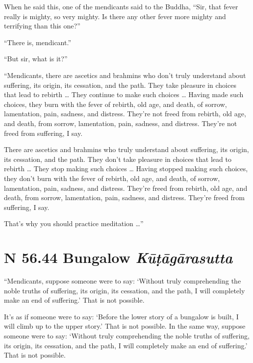 \documentclass[12pt,openany]{book}%
\newcommand*{\suttatitleacronym}[1]{\smaller[2]{#1}\vspace*{.3em}}
\newcommand*{\suttatitletranslation}[1]{\linebreak{#1}}
\newcommand*{\suttatitleroot}[1]{\linebreak\smaller[2]\itshape{#1}}
\newcommand*{\tocacronym}[1]{\hspace*{-3.3em}{#1}\quad}
\newcommand*{\toctranslation}[1]{#1}
\newcommand*{\tocroot}[1]{(\textit{#1})}
\begin{document}
When he said this, one of the mendicants said to the Buddha, “Sir, that fever really is mighty, so very mighty. Is there any other fever more mighty and terrifying than this one?” 

“There is, mendicant.” 

“But sir, what is it?” 

“Mendicants, there are ascetics and brahmins who don’t truly understand about suffering, its origin, its cessation, and the path. They take pleasure in choices that lead to rebirth … They continue to make such choices … Having made such choices, they burn with the fever of rebirth, old age, and death, of sorrow, lamentation, pain, sadness, and distress. They’re not freed from rebirth, old age, and death, from sorrow, lamentation, pain, sadness, and distress. They’re not freed from suffering, I say. 

There are ascetics and brahmins who truly understand about suffering, its origin, its cessation, and the path. They don’t take pleasure in choices that lead to rebirth … They stop making such choices … Having stopped making such choices, they don’t burn with the fever of rebirth, old age, and death, of sorrow, lamentation, pain, sadness, and distress. They’re freed from rebirth, old age, and death, from sorrow, lamentation, pain, sadness, and distress. They’re freed from suffering, I say. 

That’s why you should practice meditation …” 

%
\section*{{\suttatitleacronym SN 56.44}{\suttatitletranslation A Bungalow }{\suttatitleroot Kūṭāgārasutta}}
\addcontentsline{toc}{section}{\tocacronym{SN 56.44} \toctranslation{A Bungalow } \tocroot{Kūṭāgārasutta}}

“Mendicants, suppose someone were to say: ‘Without truly comprehending the noble truths of suffering, its origin, its cessation, and the path, I will completely make an end of suffering.’ That is not possible. 

It’s as if someone were to say: ‘Before the lower story of a bungalow is built, I will climb up to the upper story.’ That is not possible. In the same way, suppose someone were to say: ‘Without truly comprehending the noble truths of suffering, its origin, its cessation, and the path, I will completely make an end of suffering.’ That is not possible. 
\end{document}
